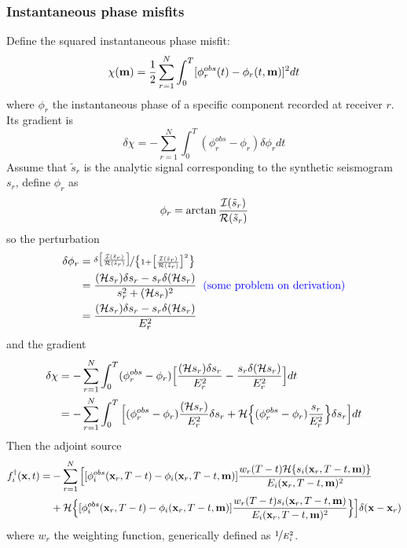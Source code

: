\subsubsection{Instantaneous phase misfits}
Define the squared instantaneous phase misfit:
\[ \chi(\mathbf{m})=\frac{1}{2}\sum_{r=1}^N\int_0^T[\phi_r^{obs}(t)-\phi_r(t,\mathbf{m})]^2dt \]
where $\phi_r$ the instantaneous phase of a specific component recorded at receiver $r$.
Its gradient is
\[ \delta\chi=-\sum_{r=1}^N\int_0^T(\phi_r^{obs}-\phi_r)\delta\phi_rdt \]
Assume that $\tilde s_r$ is the analytic signal corresponding to the synthetic seismogram $s_r$,
define $\phi_r$ as
\[ \phi_r=\arctan\frac{\mathcal{I}(\tilde s_r)}{\mathcal{R}(\tilde s_r)} \]
so the perturbation
\begin{align*}
  \delta\phi_r & =\nicefrac{\delta\big[\frac{\mathcal{I}(\tilde s_r)}{\mathcal{R}(\tilde s_r)}\big]}{\big\{1+\big[\frac{\mathcal{I}(\tilde s_r)}{\mathcal{R}(\tilde s_r)}\big]^2\big\}} \\
    & =\frac{(\mathcal{H} s_r)\delta s_r-s_r\delta(\mathcal{H} s_r)}{s_r^2+(\mathcal{H} s_r)^2} {\color{blue}\text{\hspace{2mm}(some problem on derivation)}} \\
    & =\frac{(\mathcal{H} s_r)\delta s_r-s_r\delta(\mathcal{H} s_r)}{E_r^2} \\
\end{align*}
and the gradient
\begin{align*}
  \delta\chi & =-\sum_{r=1}^N\int_0^T(\phi_r^{obs}-\phi_r)\Big[\frac{(\mathcal{H} s_r)\delta s_r}{E_r^2}-\frac{s_r\delta(\mathcal{H} s_r)}{E_r^2}\Big]dt \\
    & =-\sum_{r=1}^N\int_0^T\Big[(\phi_r^{obs}-\phi_r)\frac{(\mathcal{H} s_r)}{E_r^2}\delta s_r+\mathcal{H}\Big\{(\phi_r^{obs}-\phi_r)\frac{s_r}{E_r^2}\Big\}\delta s_r\Big]dt \\
\end{align*}
Then the adjoint source
\begin{align*}
  f_i^\dagger(\mathbf{x},t)= & -\sum_{r=1}^N\Big[[\phi_i^{obs}(\mathbf{x}_r,T-t)-\phi_i(\mathbf{x}_r,T-t,\mathbf{m})]\frac{w_r(T-t)\mathcal{H}\{s_i(\mathbf{x}_r,T-t,\mathbf{m})\}}{E_i(\mathbf{x}_r,T-t,\mathbf{m})^2} \\
    & +\mathcal{H}\Big\{[\phi_i^{obs}(\mathbf{x}_r,T-t)-\phi_i(\mathbf{x}_r,T-t,\mathbf{m})]\frac{w_r(T-t)s_i(\mathbf{x}_r,T-t,\mathbf{m})}{E_i(\mathbf{x}_r,T-t,\mathbf{m})^2}\Big\}\Big]\delta(\mathbf{x}-\mathbf{x}_r) \\
\end{align*}
where $w_r$ the weighting function, generically defined as $\nicefrac{1}{E_i^2}$.

